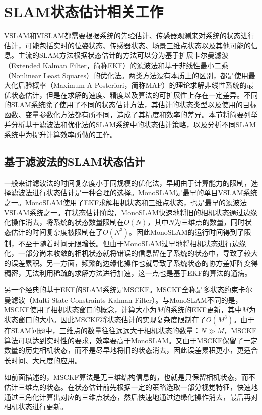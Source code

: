 \section{SLAM状态估计相关工作}

VSLAM和VISLAM都需要根据系统的先验估计、传感器观测来对系统的状态进行估计，可能包括实时的位姿状态、传感器状态、场景三维点状态以及其他可能的信息。主流的SLAM方法根据状态估计的方法可以分为基于扩展卡尔曼滤波（Extended Kalman Filter，简称EKF）的滤波法和基于非线性最小二乘（Nonlinear Least Squares）的优化法。两类方法没有本质上的区别，都是使用最大化后验概率（Maximum A-Posteriori，简称MAP）的理论求解非线性系统的最优状态估计，但是在求解的速度、精度以及算法的可扩展性上存在一定差异。不同的SLAM系统除了使用了不同的状态估计方法，其估计的状态类型以及使用的目标函数、变量参数化方法都有所不同，造成了其精度和效率的差异。本节将简要列举并分析基于滤波法和优化法的SLAM系统中的状态估计策略，以及分析不同SLAM系统中为提升计算效率所做的工作。

\subsection{基于滤波法的SLAM状态估计}

一般来讲滤波法的时间复杂度小于同规模的优化法，早期由于计算能力的限制，选择滤波法进行状态估计是一种合理的选择。MonoSLAM\citep{davison2007monoslam}是最早的单目VSLAM系统之一。MonoSLAM使用了EKF求解相机状态和三维点状态，也是最早的滤波法VSLAM系统之一。在状态估计阶段，MonoSLAM快速地将旧的相机状态通过边缘化操作消去，将系统的状态数量限制在$O(N)$，其中$N$为三维点的数量，同时状态估计的时间复杂度被限制在了$O(N^3)$。因此MonoSLAM的运行时间得到了限制，不至于随着时间无限增长。但由于MonoSLAM过早地将相机状态进行边缘化，一部分尚未收敛的相机状态就将错误的信息留在了系统的状态中，导致了较大的误差累积。另一方面，频繁的边缘化操作也就导致了系统状态的协方差矩阵变得稠密，无法利用稀疏的求解方法进行加速，这一点也是基于EKF的算法的通病。

另一个经典的基于EKF的SLAM系统是MSCKF\citep{mourikis2007multi}。MSCKF全称是多状态约束卡尔曼滤波（Multi-State Constraints Kalman Filter）。与MonoSLAM不同的是，MSCKF使用了相机状态窗口的概念，计算大小为$M$的系统的EKF更新，其中$M$为状态窗口的大小。因此MSCKF将状态估计的实现复杂度限制在了$O(M^3)$。由于在SLAM问题中，三维点的数量往往远远大于相机状态的数量：$N \gg M$，MSCKF算法可以达到实时性的要求，效率要高于MonoSLAM。又由于MSCKF保留了一定数量的历史相机状态，而不是尽早地将旧的状态消去，因此误差累积更小，更适合长时间、大尺度的应用。

如前面描述的，MSCKF算法是无三维结构信息的，也就是只保留相机状态，而不估计三维点的状态。在状态估计前先根据一定的策略选取一部分视觉特征，快速地通过三角化计算出对应的三维点状态，然后快速地通过边缘化操作消去，最后再对相机状态进行更新。

